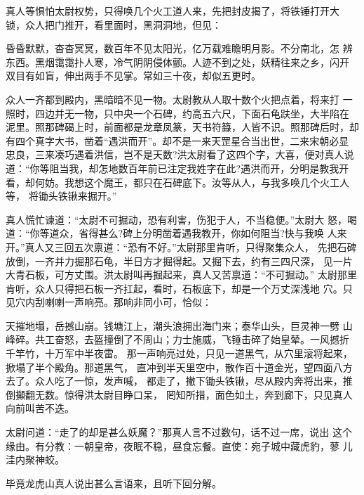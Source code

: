 真人等惧怕太尉权势，只得唤几个火工道人来，先把封皮揭了，将铁锤打开大
锁，众人把门推开，看里面时，黑洞洞地，但见：

昏昏默默，杳杳冥冥，数百年不见太阳光，亿万载难瞻明月影。不分南北，怎
辨东西。黑烟霭霭扑人寒，冷气阴阴侵体颤。人迹不到之处，妖精往来之乡，闪开
双目有如盲，伸出两手不见掌。常如三十夜，却似五更时。

众人一齐都到殿内，黑暗暗不见一物。太尉教从人取十数个火把点着，将来打
一照时，四边并无一物，只中央一个石碑，约高五六尺，下面石龟趺坐，大半陷在
泥里。照那碑碣上时，前面都是龙章凤篆，天书符籙，人皆不识。照那碑后时，却
有四个真字大书，凿着“遇洪而开”。却不是一来天罡星合当出世，二来宋朝必显
忠良，三来凑巧遇着洪信，岂不是天数?洪太尉看了这四个字，大喜，便对真人说
道：“你等阻当我，却怎地数百年前已注定我姓字在此?遇洪而开，分明是教我开
看，却何妨。我想这个魔王，都只在石碑底下。汝等从人，与我多唤几个火工人等，
将锄头铁锹来掘开。”

真人慌忙谏道：“太尉不可掘动，恐有利害，伤犯于人，不当稳便。”太尉大
怒，喝道：“你等道众，省得甚么?碑上分明凿着遇我教开，你如何阻当?快与我唤
人来开。”真人又三回五次禀道：“恐有不好。”太尉那里肯听，只得聚集众人，
先把石碑放倒，一齐并力掘那石龟，半日方才掘得起。又掘下去，约有三四尺深，
见一片大青石板，可方丈围。洪太尉叫再掘起来，真人又苦禀道：“不可掘动。”
太尉那里肯听，众人只得把石板一齐扛起，看时，石板底下，却是一个万丈深浅地
穴。只见穴内刮喇喇一声响亮。那响非同小可，恰似：

天摧地塌，岳撼山崩。钱塘江上，潮头浪拥出海门来；泰华山头，巨灵神一劈
山峰碎。共工奋怒，去盔撞倒了不周山；力士施威，飞锤击碎了始皇辇。一风撼折
千竿竹，十万军中半夜雷。
那一声响亮过处，只见一道黑气，从穴里滚将起来，掀塌了半个殿角。那道黑气，
直冲到半天里空中，散作百十道金光，望四面八方去了。众人吃了一惊，发声喊，
都走了，撇下锄头铁锹，尽从殿内奔将出来，推倒攧翻无数。惊得洪太尉目睁口呆，
罔知所措，面色如土，奔到廊下，只见真人向前叫苦不迭。

太尉问道：“走了的却是甚么妖魔？”那真人言不过数句，话不过一席，说出
这个缘由。有分教：一朝皇帝，夜眠不稳，昼食忘餐。直使：宛子城中藏虎豹，蓼
儿洼内聚神蛟。

毕竟龙虎山真人说出甚么言语来，且听下回分解。